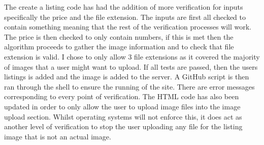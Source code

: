 The create a listing code has had the addition of more verification for inputs specifically the price and the file extension. The inputs are first all checked to contain something meaning that the rest of the verification processes will work. The price is then checked to only contain numbers, if this is met then the algorithm proceeds to gather the image information and to check that file extension is valid. I chose to only allow 3 file extensions as it covered the majority of images that a user might want to upload. If all tests are passed, then the users listings is added and the image is added to the server. A GitHub script is then ran through the shell to ensure the running of the site. There are error messages corresponding to every point of verification. The HTML code has also been updated in order to only allow the user to upload image files into the image upload section. Whilst operating systems will not enforce this, it does act as another level of verification to stop the user uploading any file for the listing image that is not an actual image.
